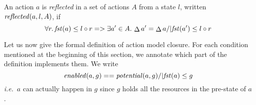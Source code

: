 \begin{definition}
  An action $a$ is \emph{reflected} in a set of actions $A$ from a state
  $l$, written $\mathit{reflected}(a,l,A)$, if
  \vspace{-1ex}
  \[
  \forall r.\, \mathit{fst}(a)\leq l\circ r =>
  \exists a'\in A.\, \mathop{\Delta} a' = \mathop{\Delta} a /| \mathit{fst}(a')\leq
  l\circ r
  \]
\end{definition}

Let us now give the formal definition of action model closure. For
each condition mentioned at the beginning of this section, we annotate
which part of the definition implements them. We write
  \vspace{-1ex}
\[
  \vspace{-1ex}
\m{enabled}(a,g) == \m{potential}(a,g) /| \m{fst}(a)\leq g
\]
\textit{i.e.}\ $a$ can actually happen in $g$ since $g$ holds all the
resources in the pre-state of $a$.

